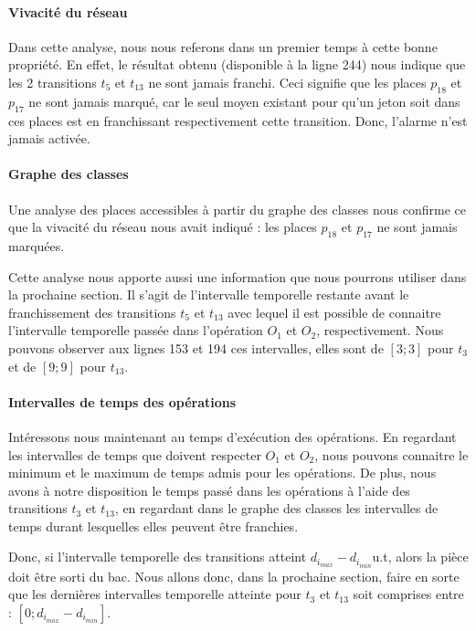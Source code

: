 \paragraph*{Vivacité du réseau} Dans cette analyse, nous nous referons dans un premier temps à cette bonne propriété. En effet, le résultat obtenu (disponible à la ligne 244) nous indique que les 2 transitions $t_5$ et $t_{13}$ ne sont jamais franchi. Ceci signifie que les places $p_{18}$ et $p_{17}$ ne sont jamais marqué, car le seul moyen existant pour qu'un jeton soit dans ces places est en franchissant respectivement cette transition. Donc, l'alarme n'est jamais activée.

\paragraph*{Graphe des classes}Une analyse des places accessibles à partir du graphe des classes nous confirme ce que la vivacité du réseau nous avait indiqué : les places $p_{18}$ et $p_{17}$ ne sont jamais marquées. 

Cette analyse nous apporte aussi une information que nous pourrons utiliser dans la prochaine section. Il s'agit de l'intervalle temporelle restante avant le franchissement des transitions $t_5$ et $t_{13}$ avec lequel il est possible de connaitre l'intervalle temporelle passée dans l'opération $O_1$ et $O_2$, respectivement. Nous pouvons observer aux lignes 153 et 194 ces intervalles, elles sont de $[3;3]$ pour $t_3$ et de $[9;9]$ pour $t_{13}$. 

\paragraph*{Intervalles de temps des opérations} Intéressons nous maintenant au temps d'exécution des opérations. En regardant les intervalles de temps que doivent respecter $O_1$ et $O_2$, nous pouvons connaitre le minimum et le maximum de temps admis pour les opérations. De plus, nous avons à notre disposition le temps passé dans les opérations à l'aide des transitions $t_3$ et $t_{13}$, en regardant dans le graphe des classes les intervalles de temps durant lesquelles elles peuvent être franchies. 

Donc, si l'intervalle temporelle des transitions atteint $d_{i_{max}} - d_{i_{min}}$u.t, alors la pièce doit être sorti du bac. Nous allons donc, dans la prochaine section, faire en sorte que les dernières intervalles temporelle atteinte pour $t_3$ et $t_{13}$ soit comprises entre : $[0;d_{i_{max}} - d_{i_{min}}]$.

